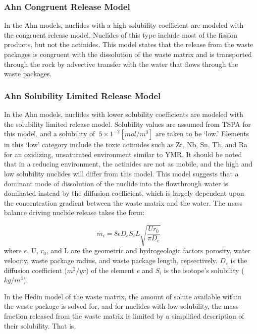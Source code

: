{\subsubsection{Ahn Congruent Release Model} 

In the Ahn models, nuclides with a high solubility coefficient are modeled with
the congruent release model.  Nuclides of this type include most of the fission
products, but not the actinides. This model states that the release from the
waste packages is congruent with the dissolution of the waste matrix and is
transported through the rock by advective transfer with the water that flows
through the waste packages.  

\subsubsection{Ahn Solubility Limited Release Model}

In the Ahn models, nuclides with lower solubility coefficients are modeled with
the solubility limited release model.  Solubility values are assumed from TSPA
for this model, and a solubility of $~5\times 1^{-2} [mol/m^3]$ are taken to be
`low.' Elements in this `low' category include the toxic actinides such as Zr,
Nb, Sn, Th, and Ra for an oxidizing, unsaturated environment similar to \gls{YMR}.
It should be noted that in a reducing environment, the actinides are not as mobile, 
and the high and low solubility nuclides will differ from this model.
This model suggests that a dominant mode of dissolution of
the nuclide into the flowthrough water is dominated instead by the diffusion
coefficient, which is largely dependent upon the concentration gradient between
the waste matrix and the water. The mass balance driving nuclide release takes
the form:

\begin{equation} \dot{m_i}=8\epsilon D_eS_iL\sqrt{\frac{Ur_0}{\pi D_e}}
\end{equation} where $\epsilon$, U, $r_0$, and L are the geometric and
hydrogeologic factors porosity, water velocity, waste package radius, and waste
package length, repsectively. $D_e$ is the diffusion coefficient ($m^2/yr$) of
the element \emph{e} and $S_i$ is the isotope's solubility ($kg/m^3$).

In the Hedin model of the waste matrix, the amount of solute available within
the waste package is solved for, and for nuclides with low solubility, the mass
fraction released from the waste matrix is limited by a simplified description
of their solubility. That is, 

}
